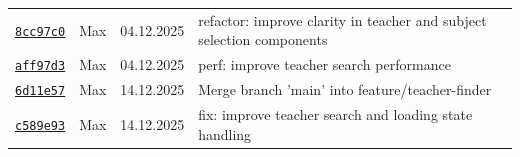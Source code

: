 \documentclass{article}%
\begin{document}
\begin{longtable}{l l l p{12cm}}
\href{https://github.com/scriptor1000/homeworks/pull/18/commits/8cc97c0b15b41b38e9b13ce45f91e5fd29f5ec7e}{\underline{\texttt{8cc97c0}}}&Max&04.12.2025& refactor: improve clarity in teacher and subject selection components\\%
\href{https://github.com/scriptor1000/homeworks/pull/18/commits/aff97d373f0d7d4dfbfd2c56ed01aac37e30398a}{\underline{\texttt{aff97d3}}}&Max&04.12.2025&perf: improve teacher search performance\\%
\href{https://github.com/scriptor1000/homeworks/pull/18/commits/6d11e5771971ae5366e033c1c826b3c120b6c8c7}{\underline{\texttt{6d11e57}}}&Max&14.12.2025&Merge branch 'main' into feature/teacher{-}finder\\%
\href{https://github.com/scriptor1000/homeworks/pull/18/commits/c589e931ba196eb0d656811c55ade7cfc2f899da}{\underline{\texttt{c589e93}}}&Max&14.12.2025&fix: improve teacher search and loading state handling\\%
\end{longtable}

%
\end{document}
